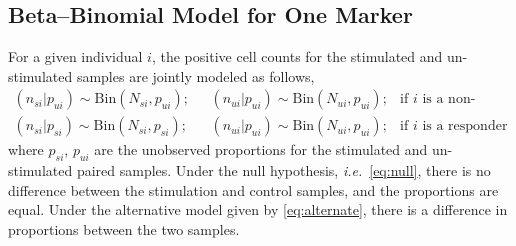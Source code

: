 \documentclass[11pt]{article}
\begin{document}
\subsection{Beta--Binomial Model for One Marker}
For a given individual $i$, the positive cell counts for the stimulated and un-stimulated samples are jointly modeled as follows,
\begin{align}
(n_{si}|p_{ui}) \sim \mathrm{Bin}(N_{si},p_{ui});\text{ }& (n_{ui}|p_{ui}) \sim \mathrm{Bin}(N_{ui},p_{ui})\label{eq:null};&\text{if $i$ is a non-responder}\\
(n_{si}|p_{si}) \sim \mathrm{Bin}(N_{si},p_{si});\text{ }& (n_{ui}|p_{ui}) \sim \mathrm{Bin}(N_{ui},p_{ui});&\text{if $i$ is a responder}\label{eq:alternate}
 \end{align}
 where $p_{si}$, $p_{ui}$ are the unobserved proportions for the stimulated and un-stimulated paired samples. Under the null hypothesis, \textit{i.e.}~\eqref{eq:null}, there is no difference between the stimulation and control samples, and the proportions are equal. Under the alternative model given by \eqref{eq:alternate}, there is a difference in proportions between the two samples.
\end{document}

